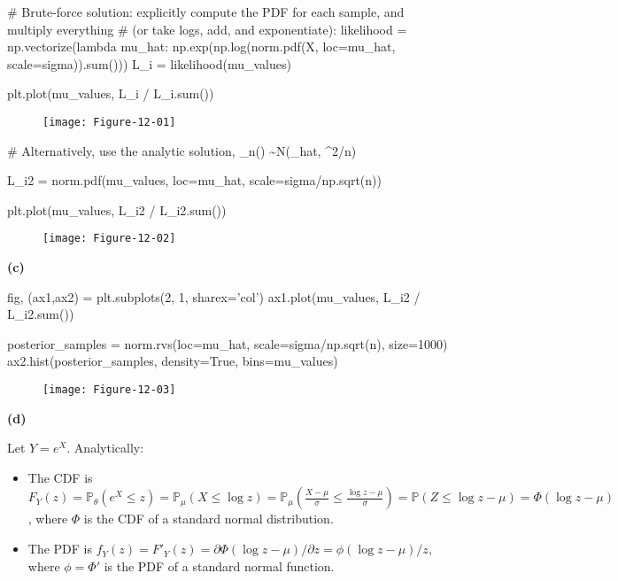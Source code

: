\begin{python}
# Brute-force solution: explicitly compute the PDF for each sample, and multiply everything 
# (or take logs, add, and exponentiate):
likelihood = np.vectorize(lambda mu_hat: np.exp(np.log(norm.pdf(X, loc=mu_hat, scale=sigma)).sum()))
L_i = likelihood(mu_values)

plt.plot(mu_values, L_i / L_i.sum())
\end{python}

\begin{figure}[H]
\texttt{[image: Figure-12-01]}
\end{figure}

\begin{python}
# Alternatively, use the analytic solution, _n(\mu) \sim N(\mu_hat, \sigma^2/n)

L_i2 = norm.pdf(mu_values, loc=mu_hat, scale=sigma/np.sqrt(n))

plt.plot(mu_values, L_i2 / L_i2.sum())
\end{python}


\begin{figure}[H]
\texttt{[image: Figure-12-02]}
\end{figure}

\textbf{(c)}

\begin{python}
fig, (ax1,ax2) = plt.subplots(2, 1, sharex='col')
ax1.plot(mu_values, L_i2 / L_i2.sum())

posterior_samples = norm.rvs(loc=mu_hat, scale=sigma/np.sqrt(n), size=1000)
ax2.hist(posterior_samples, density=True, bins=mu_values)
\end{python}

\begin{figure}[H]
\texttt{[image: Figure-12-03]}
\end{figure}

\textbf{(d)}

Let \(Y = e^X\). Analytically:

\begin{itemize}[tightlist]
\item
  The CDF is
  \(F_Y(z) = \mathbb{P}_\theta(e^X \leq z) = \mathbb{P}_\mu(X \leq \log z) = \mathbb{P}_\mu \left( \frac{X - \mu}{\sigma} \leq \frac{\log z - \mu}{\sigma} \right) = \mathbb{P}(Z \leq \log z - \mu) = \Phi(\log z - \mu)\),
  where \(\Phi\) is the CDF of a standard normal distribution.
\item
  The PDF is
  \(f_Y(z) = F'_Y(z) = \partial \Phi(\log z - \mu) / \partial z = \phi(\log z - \mu) / z\),
  where \(\phi = \Phi'\) is the PDF of a standard normal function.
\end{itemize}

